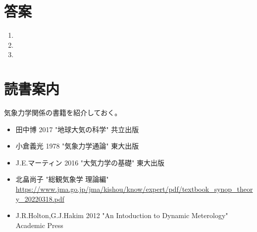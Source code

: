 \documentclass{jsarticle}
\newenvironment{problems}
{
  \renewcommand\labelenumi{\doublebox{\arabic{enumi}}}
  \begin{enumerate}
}{
  \end{enumerate}
  \renewcommand\labelenumi{\arabic{enumi}.}
}
\begin{document}
\section{答案}
\begin{problems}
\item 

\item 

\item 

\end{problems}

\section{読書案内}
気象力学関係の書籍を紹介しておく。

\begin{itemize}
\item 田中博 2017 "地球大気の科学" 共立出版
\item 小倉義光 1978 "気象力学通論" 東大出版
\item J.E.マーティン 2016 "大気力学の基礎" 東大出版
\item 北畠尚子 "総観気象学 理論編" \url{https://www.jma.go.jp/jma/kishou/know/expert/pdf/textbook_synop_theory_20220318.pdf}
\item J.R.Holton,G.J.Hakim 2012 "An Intoduction to Dynamic Meterology" Academic Press
\end{itemize}
\end{document}
